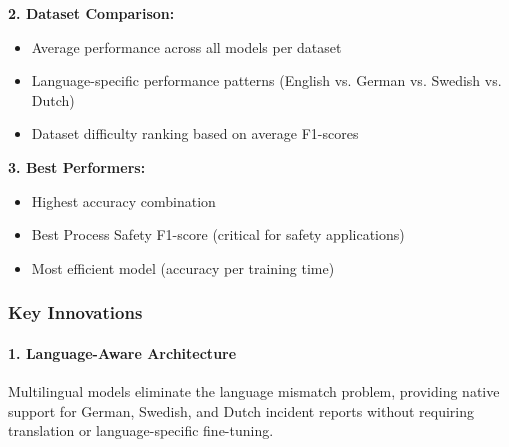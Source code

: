 \documentclass[11pt, titlepage, bibliography=totoc]{scrreprt}
\begin{document}
\textbf{2. Dataset Comparison:}
\begin{itemize}
    \item Average performance across all models per dataset
    \item Language-specific performance patterns (English vs. German vs. Swedish vs. Dutch)
    \item Dataset difficulty ranking based on average F1-scores
\end{itemize}

\textbf{3. Best Performers:}
\begin{itemize}
    \item Highest accuracy combination
    \item Best Process Safety F1-score (critical for safety applications)
    \item Most efficient model (accuracy per training time)
\end{itemize}




\subsubsection{Key Innovations}

\paragraph{1. Language-Aware Architecture}
Multilingual models eliminate the language mismatch problem, providing native support for German, Swedish, and Dutch incident reports without requiring translation or language-specific fine-tuning.
\end{document}
